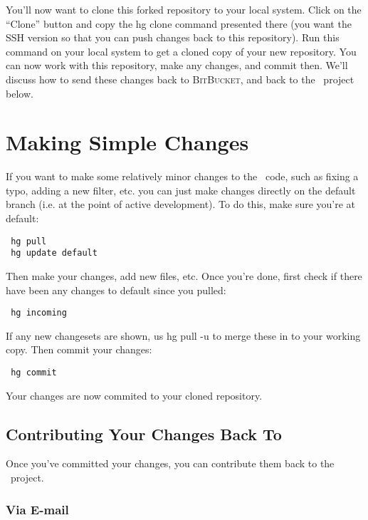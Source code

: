 You'll now want to clone this forked repository to your local system. Click on the ``Clone'' button and copy the {\normalfont \ttfamily hg clone} command presented there (you want the {\normalfont \ttfamily SSH} version so that you can push changes back to this repository). Run this command on your local system to get a cloned copy of your new repository. You can now work with this repository, make any changes, and commit then. We'll discuss how to send these changes back to {\normalfont \scshape BitBucket}, and back to the \glc\ project below.

\section{Making Simple Changes}

If you want to make some relatively minor changes to the \glc\ code, such as fixing a typo, adding a new filter, etc. you can just make changes directly on the {\normalfont \ttfamily default} branch (i.e. at the point of active development). To do this, make sure you're at {\normalfont \ttfamily default}:
\begin{verbatim}
 hg pull
 hg update default
\end{verbatim}
Then make your changes, add new files, etc. Once you're done, first check if there have been any changes to {\normalfont \ttfamily default} since you {\normalfont \ttfamily pull}ed:
\begin{verbatim}
 hg incoming
\end{verbatim}
If any new changesets are shown, us {\normalfont \ttfamily hg pull -u} to merge these in to your working copy. Then commit your changes:
\begin{verbatim}
 hg commit
\end{verbatim}
Your changes are now commited to your cloned repository.

\subsection{Contributing Your Changes Back To \glc}

Once you've committed your changes, you can contribute them back to the \glc\ project.

\subsubsection{Via E-mail}

